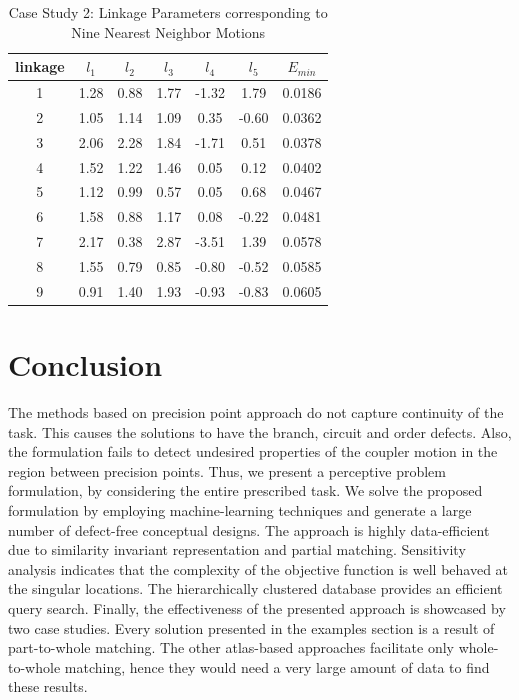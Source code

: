\documentclass[twocolumn,10pt]{asme2ej}
\begin{document}
\begin{table}
\caption{Case Study 2: Linkage Parameters corresponding to Nine Nearest Neighbor Motions}
\centering
\label{ex2_knnLinkageData}
\begin{tabular}{ccccccc}
\hline
  linkage & $l_1$ & $l_2$ & $l_3$ & $l_4$ & $l_5$ & $E_{min}$ \\
\hline
 1 & 1.28 & 0.88 & 1.77 & -1.32 & 1.79 & 0.0186   \\
 2 & 1.05 & 1.14 & 1.09 & 0.35 & -0.60 & 0.0362   \\
 3 & 2.06 & 2.28 & 1.84 & -1.71 & 0.51 & 0.0378   \\
 4 & 1.52 & 1.22 & 1.46 & 0.05 & 0.12 & 0.0402    \\
 5 & 1.12 & 0.99 & 0.57 & 0.05 & 0.68 & 0.0467    \\
 6 & 1.58 & 0.88 & 1.17 & 0.08 & -0.22 & 0.0481   \\
 7 & 2.17 & 0.38 & 2.87 & -3.51 & 1.39 & 0.0578   \\
 8 & 1.55 & 0.79 & 0.85 & -0.80 & -0.52 & 0.0585  \\
 9 & 0.91 & 1.40 & 1.93 & -0.93 & -0.83 & 0.0605
\end{tabular}
\end{table}




\section*{Conclusion}
The methods based on precision point approach do not capture continuity of the task.
This causes the solutions to have the branch, circuit and order defects.
Also, the formulation fails to detect undesired properties of the coupler motion in the region between precision points.
Thus, we present a perceptive problem formulation, by considering the entire prescribed task.
We solve the proposed formulation by employing machine-learning techniques and generate a large number of defect-free conceptual designs.
The approach is highly data-efficient due to similarity invariant representation and partial matching.
Sensitivity analysis indicates that the complexity of the objective function is well behaved at the singular locations.
The hierarchically clustered database provides an efficient query search.
Finally, the effectiveness of the presented approach is showcased by two case studies.
Every solution presented in the examples section is a result of part-to-whole matching.
The other atlas-based approaches facilitate only whole-to-whole matching, hence they would need a very large amount of data to find these results.
\end{document}
